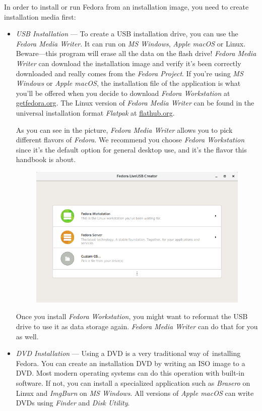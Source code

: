 In order to install or run Fedora from an installation image, you need to create installation media first:
\begin{itemize}
\item\emph{USB Installation} --- To create a USB installation drive, you can use the \emph{Fedora Media Writer}. It can run on \emph{MS Windows}, \emph{Apple macOS} or Linux. Beware---this program will erase all the data on the flash drive! \emph{Fedora Media Writer} can download the installation image and verify it's been correctly downloaded and really comes from the \emph{Fedora Project}. If you're using \emph{MS Windows} or \emph{Apple macOS}, the installation file of the application is what you'll be offered when you decide to download \emph{Fedora Workstation} at \url{getfedora.org}. The Linux version of \emph{Fedora Media Writer} can be found in the universal installation format \emph{Flatpak} at \url{flathub.org}.

As you can see in the picture, \emph{Fedora Media Writer} allows you to pick different flavors of \emph{Fedora}. We recommend you choose \emph{Fedora Workstation} since it's the default option for general desktop use, and it's the flavor this handbook is about.

\begin{figure}[tbp]
\begin{center}
\includegraphics[width=.75\textwidth]{img/fedora-media-writer}
 \label{fig:fedora_media_writer}
\end{center}
\end{figure}

Once you install \emph{Fedora Workstation}, you might want to reformat the USB drive to use it as data storage again. \emph{Fedora Media Writer} can do that for you as well.

\item\emph{DVD Installation} --- Using a DVD is a very traditional way of~installing Fedora. You can create an installation DVD by writing an ISO image to a DVD. Most modern operating systems can do this operation with built-in software. If not, you can install a specialized application such as \emph{Brasero} on Linux and \emph{ImgBurn} on \emph{MS Windows}. All versions of \emph{Apple macOS} can write DVDs using \emph{Finder} and \emph{Disk Utility}.
\end{itemize}

